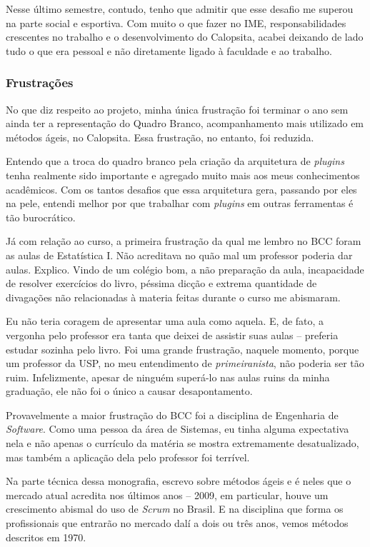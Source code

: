 \documentclass[titlepage,a4paper]{article}
\newcommand{\calopsita}{Calopsita}
\begin{document}
Nesse último semestre, contudo, tenho que admitir que esse desafio me superou na parte social e esportiva. Com muito o que fazer no IME, responsabilidades crescentes no trabalho e o desenvolvimento do \calopsita{}, acabei deixando de lado tudo o que era pessoal e não diretamente ligado à faculdade e ao trabalho.

\subsubsection*{Frustrações}

No que diz respeito ao projeto, minha única frustração foi terminar o ano sem ainda ter a representação do Quadro Branco, acompanhamento mais utilizado em métodos ágeis, no \calopsita{}. Essa frustração, no entanto, foi reduzida.

Entendo que a troca do quadro branco pela criação da arquitetura de \textit{plugins} tenha realmente sido importante e agregado muito mais aos meus conhecimentos acadêmicos. Com os tantos desafios que essa arquitetura gera, passando por eles na pele, entendi melhor por que trabalhar com \textit{plugins} em outras ferramentas é tão burocrático. 

Já com relação ao curso, a primeira frustração da qual me lembro no BCC foram as aulas de Estatística I. Não acreditava no quão mal um professor poderia dar aulas. Explico. Vindo de um colégio bom, a não preparação da aula, incapacidade de resolver exercícios do livro, péssima dicção e extrema quantidade de divagações não relacionadas à materia feitas durante o curso me abismaram. 

Eu não teria coragem de apresentar uma aula como aquela. E, de fato, a vergonha pelo professor era tanta que deixei de assistir suas aulas -- preferia estudar sozinha pelo livro. Foi uma grande frustração, naquele momento, porque um professor da USP, no meu entendimento de \textit{primeiranista}, não poderia ser tão ruim. Infelizmente, apesar de ninguém superá-lo nas aulas ruins da minha graduação, ele não foi o único a causar desapontamento.

Provavelmente a maior frustração do BCC foi a disciplina de Engenharia de \textit{Software}. Como uma pessoa da área de Sistemas, eu tinha alguma expectativa nela e não apenas o currículo da matéria se mostra extremamente desatualizado, mas também a aplicação dela pelo professor foi terrível.

Na parte técnica dessa monografia, escrevo sobre métodos ágeis e é neles que o mercado atual acredita nos últimos anos -- 2009, em particular, houve um crescimento abismal do uso de \textit{Scrum} no Brasil. E na disciplina que forma os profissionais que entrarão no mercado dalí a dois ou três anos, vemos métodos descritos em 1970.
\end{document}
